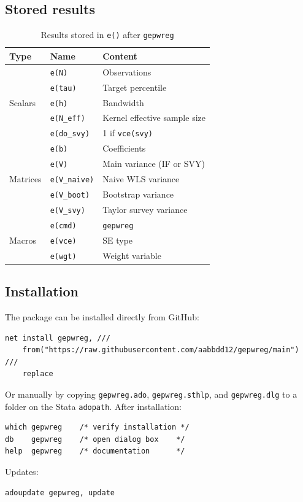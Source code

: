 \documentclass[12pt,a4paper]{article}
\theoremstyle{definition}
\begin{document}
\subsection{Stored results}

\begin{table}[htbp]\centering\small
\caption{Results stored in \texttt{e()} after \texttt{gepwreg}}
\begin{tabular}{l l p{6cm}}
\toprule Type&Name&Content\\\midrule
\multirow{5}{*}{Scalars}
  &\texttt{e(N)}&Observations\\
  &\texttt{e(tau)}&Target percentile\\
  &\texttt{e(h)}&Bandwidth\\
  &\texttt{e(N\_eff)}&Kernel effective sample size\\
  &\texttt{e(do\_svy)}&1 if \texttt{vce(svy)}\\
\midrule
\multirow{5}{*}{Matrices}
  &\texttt{e(b)}&Coefficients\\
  &\texttt{e(V)}&Main variance (IF or SVY)\\
  &\texttt{e(V\_naive)}&Naive WLS variance\\
  &\texttt{e(V\_boot)}&Bootstrap variance\\
  &\texttt{e(V\_svy)}&Taylor survey variance\\
\midrule
\multirow{3}{*}{Macros}
  &\texttt{e(cmd)}&\texttt{gepwreg}\\
  &\texttt{e(vce)}&SE type\\
  &\texttt{e(wgt)}&Weight variable\\
\bottomrule
\end{tabular}
\end{table}

\subsection{Installation}

\noindent The package can be installed directly from GitHub:

\begin{verbatim}
net install gepwreg, ///
    from("https://raw.githubusercontent.com/aabbdd12/gepwreg/main") ///
    replace
\end{verbatim}

\noindent Or manually by copying \texttt{gepwreg.ado}, \texttt{gepwreg.sthlp},
and \texttt{gepwreg.dlg} to a folder on the Stata \texttt{adopath}.
After installation:

\begin{verbatim}
which gepwreg    /* verify installation */
db    gepwreg    /* open dialog box    */
help  gepwreg    /* documentation      */
\end{verbatim}

\noindent Updates:

\begin{verbatim}
adoupdate gepwreg, update
\end{verbatim}
\end{document}
